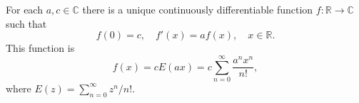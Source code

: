 For each $a, c \in \mathbb{C}$ there is a unique continuously differentiable function $f: \mathbb{R} \to \mathbb{C}$ such that
$$f(0) = c, \quad f'(x) = af(x), \quad x \in \mathbb{R}.$$
This function is
$$f(x) = cE(ax) = c \sum_{n=0}^{\infty} \frac{a^n x^n}{n!},$$
where $E(z) = \sum_{n=0}^{\infty} z^n/n!$.
